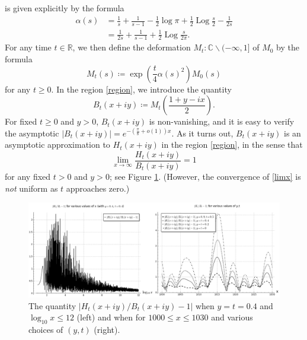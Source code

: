 \documentclass[a4paper,11pt,twoside]{amsart}
\newcommand\R{\mathbb{R}}
\newcommand\C{\mathbb{C}}
\newcommand\Log{{\operatorname{Log}}}
\begin{document}
is given explicitly by the formula
\begin{equation}\label{alpha-form}
\begin{split}
 \alpha(s) &= \frac{1}{s} + \frac{1}{s-1} - \frac{1}{2} \log \pi + \frac{1}{2} \Log \frac{s}{2} - \frac{1}{2s} \\
&= \frac{1}{2s} + \frac{1}{s-1} + \frac{1}{2} \Log \frac{s}{2\pi}.
\end{split}
\end{equation}
For any time $t \in \R$, we then define the deformation $M_t: \C \backslash (-\infty,1]$ of $M_0$ by the formula
\begin{equation}\label{Mt-def}
M_t(s) \coloneqq \exp\left( \frac{t}{4} \alpha(s)^2 \right) M_0(s)
\end{equation}
for any $t \geq 0$.
In the region \eqref{region}, we introduce the quantity
\begin{equation}\label{bo-def} 
B_t(x+iy) \coloneqq M_t\left(\frac{1+y-ix}{2}\right).
\end{equation} 
For fixed $t \geq 0$ and $y>0$, $B_t(x+iy)$ is non-vanishing, and it is easy to verify the asymptotic $|B_t(x+iy)| = e^{-(\frac{\pi}{8} + o(1)) x}$.  As it turns out, $B_t(x+iy)$ is an asymptotic approximation to $H_t(x+iy)$ in the region \eqref{region}, in the sense that
\begin{equation}\label{limx}
 \lim_{x \to \infty} \frac{H_t(x+iy)}{B_t(x+iy)} = 1
\end{equation}
for any fixed $t>0$ and $y>0$; see Figure \ref{ht-bt}.  (However, the convergence of \eqref{limx} is \emph{not} uniform as $t$ approaches zero.)

\begin{figure}[ht!]
  \includegraphics[width=1.0\linewidth]{ftvsht.png}
  \caption{The quantity $|H_t(x+iy)/B_t(x+iy) - 1|$ when $y=t=0.4$ and $\log_{10} x \leq 12$ (left) and when for $1000 \leq x \leq 1030$ and various choices of $(y,t)$ (right).}
\label{ht-bt}
\end{figure}
\end{document}
